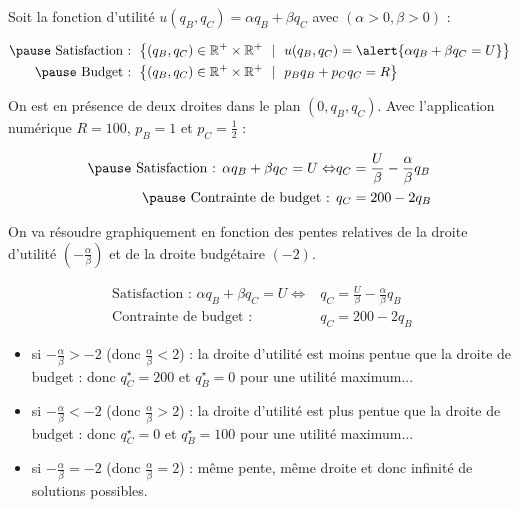 \documentclass[9pt,professionalfonts,handout,hyperref]{beamer}
\begin{document}
\begin{frame}

	Soit la fonction d'utilité $u(q_B, q_C) = \alpha q_B + \beta q_C$ avec $(\alpha>0, \beta>0)$ :

	\[\begin{aligned}
\pause 	\text{ Satisfaction :   }&\left\{(q_B, q_C) \in \mathbb{R}^{+}\times\mathbb{R}^{+} ~~|~~u(q_B, q_C) = \alert{\alpha q_B + \beta q_C = U} \right\} \\
\pause 	\text{ Budget :   }&\left\{(q_B, q_C) \in \mathbb{R}^{+}\times\mathbb{R}^{+} ~~|~~p_Bq_B + p_Cq_C=R\right\}
	\end{aligned}\]

	\bigskip

\pause 	On est en présence de deux droites dans le plan $(0,q_B,q_C)$. Avec l'application numérique $R =100$, $p_B= 1$ et $p_C = \frac{1}{2}$ :

	\[\begin{aligned}
\pause 	\text{ Satisfaction :   }\alpha q_B + \beta q_C = U \Leftrightarrow &q_C = \frac{U}{\beta}-\frac{\alpha}{\beta}q_B \\
\pause 	\text{ Contrainte de budget : }&q_C = 200-2q_B
	\end{aligned}\]

\bigskip

\pause On va résoudre graphiquement en fonction des pentes relatives de la droite d'utilité $(-\frac{\alpha}{\beta})$ et de la droite budgétaire $(-2)$.

\end{frame}

\begin{frame}

\[\begin{aligned}
\text{ Satisfaction :   }\alpha q_B + \beta q_C = U \Leftrightarrow &q_C = \frac{U}{\beta}-\frac{\alpha}{\beta}q_B \\
\text{ Contrainte de budget :   }&q_C = 200-2q_B
\end{aligned}\]

\bigskip

\begin{itemize}
\pause 	\item si $-\frac{\alpha}{\beta}>-2$ (donc $\frac{\alpha}{\beta}<2$) : \pause la droite d'utilité est moins pentue que la droite de budget \pause : donc $q_C^\star=200$ et $q_B^\star=0$ pour une utilité maximum...\newline

\pause 	\item si $-\frac{\alpha}{\beta}<-2$ (donc $\frac{\alpha}{\beta}>2$) : \pause la droite d'utilité est plus pentue que la droite de budget \pause : donc $q_C^\star=0$ et $q_B^\star=100$ pour une utilité maximum...\newline

\pause 	\item si $-\frac{\alpha}{\beta}=-2$ (donc $\frac{\alpha}{\beta}=2$) : \pause même pente, même droite et donc infinité de solutions possibles.
\end{itemize}

\end{frame}
\end{document}
